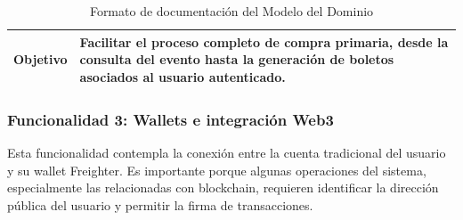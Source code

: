 \documentclass[12pt,letterpaper]{article}
\begin{document}
\begin{table}[H]
\begin{tabularx}{\textwidth}{|p{3.2cm}|X|p{3.8cm}|}
\textbf{Objetivo} & 
\multicolumn{2}{X|}{Facilitar el proceso completo de compra primaria, desde la consulta del evento hasta la generación de boletos asociados al usuario autenticado.} \\ \hline

\end{tabularx}

\caption{Formato de documentación del Modelo del Dominio}
\label{tab:modelo_dominio_catalogo_carrito_orden_boleto}
\normalsize
\end{table}

\subsubsection{Funcionalidad 3: Wallets e integración Web3}
Esta funcionalidad contempla la conexión entre la cuenta tradicional del usuario y su wallet Freighter. Es importante porque algunas operaciones del sistema, especialmente las relacionadas con blockchain, requieren identificar la dirección pública del usuario y permitir la firma de transacciones.
\end{document}
